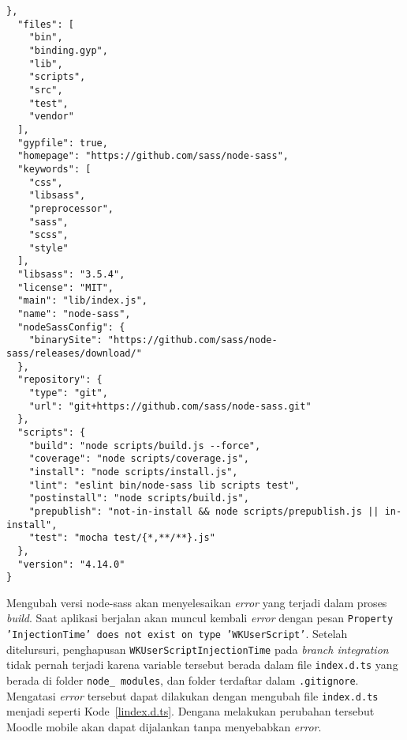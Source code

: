 \begin{lstlisting}[frame=single, label ={node:sass version}, caption = Perubahan versi node-sass pada \texttt{package-lock.json} ]
  },
  "files": [
    "bin",
    "binding.gyp",
    "lib",
    "scripts",
    "src",
    "test",
    "vendor"
  ],
  "gypfile": true,
  "homepage": "https://github.com/sass/node-sass",
  "keywords": [
    "css",
    "libsass",
    "preprocessor",
    "sass",
    "scss",
    "style"
  ],
  "libsass": "3.5.4",
  "license": "MIT",
  "main": "lib/index.js",
  "name": "node-sass",
  "nodeSassConfig": {
    "binarySite": "https://github.com/sass/node-sass/releases/download/"
  },
  "repository": {
    "type": "git",
    "url": "git+https://github.com/sass/node-sass.git"
  },
  "scripts": {
    "build": "node scripts/build.js --force",
    "coverage": "node scripts/coverage.js",
    "install": "node scripts/install.js",
    "lint": "eslint bin/node-sass lib scripts test",
    "postinstall": "node scripts/build.js",
    "prepublish": "not-in-install && node scripts/prepublish.js || in-install",
    "test": "mocha test/{*,**/**}.js"
  },
  "version": "4.14.0"
}

\end{lstlisting}

Mengubah versi node-sass akan menyelesaikan \textit{error} yang terjadi dalam proses \textit{build}. Saat aplikasi berjalan akan muncul kembali \textit{error} dengan pesan \texttt{Property 'InjectionTime' does not exist on type 'WKUserScript'}. Setelah ditelursuri, penghapusan \texttt{WKUserScriptInjectionTime} pada \textit{branch integration} tidak pernah terjadi karena variable tersebut berada dalam file \texttt{index.d.ts} yang berada di folder \texttt{node\_ modules}, dan folder terdaftar dalam \texttt{.gitignore}. Mengatasi \textit{error} tersebut dapat dilakukan dengan mengubah file \texttt{index.d.ts} menjadi seperti \mbox{Kode \ref{lindex.d.ts}}. Dengana melakukan perubahan tersebut Moodle mobile akan dapat dijalankan tanpa menyebabkan \textit{error}.

